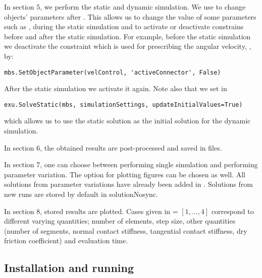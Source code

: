 \item{In section 5, we perform the static and dynamic simulation. %
We use  to change objects' parameters after . This allows us to change the value of some parameters such as ,  during the static simulation and to activate or deactivate constrains before and after the static simulation.
For example, before the static simulation we deactivate the constraint which is used for prescribing the angular velocity, , by:
\pythonstyle
\begin{tcolorbox}\begin{lstlisting}
mbs.SetObjectParameter(velControl, 'activeConnector', False)
\end{lstlisting}\end{tcolorbox} 
After the static simulation we activate it again.
Note also that we set  in 
\pythonstyle
\begin{tcolorbox}\begin{lstlisting}
exu.SolveStatic(mbs, simulationSettings, updateInitialValues=True) 
\end{lstlisting}\end{tcolorbox}
which allows us to use the static solution as the initial solution for the dynamic simulation.}
\item{In section 6, the obtained results are post-processed and saved in files.}
\item{In section 7, one can choose between performing single simulation and performing parameter variation.
The option for plotting figures can be chosen as well. All solutions from parameter variations have already been added in . Solutions from new runs are stored by default in solutionNosync.} %
\item{In section 8, stored results are plotted. Cases given in  = $[1,..., 4]$ correspond to different varying quantities; number of elements, step size, other quantities (number of segments, normal contact stiffness, tangential contact stiffness, dry friction coefficient) and evaluation time.}
%

\ei
\subsection{Installation and running}
